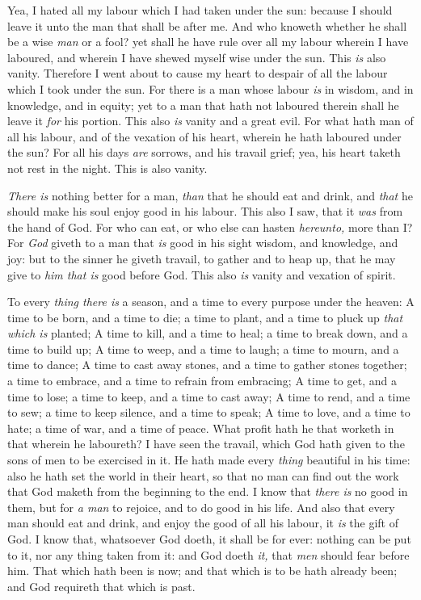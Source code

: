 \documentclass[11pt,letterpaper,oneside]{memoir}
\begin{document}
Yea, I hated all my labour which I had taken under the sun: because I 
should leave it unto the man that shall be after me. And who knoweth 
whether he shall be a wise \emph{man} or a fool? yet shall he have rule 
over all my labour wherein I have laboured, and wherein I have shewed 
myself wise under the sun. This \emph{is} also vanity. Therefore I went 
about to cause my heart to despair of all the labour which I took under 
the sun. For there is a man whose labour \emph{is} in wisdom, and in 
knowledge, and in equity; yet to a man that hath not laboured therein 
shall he leave it \emph{for} his portion. This also \emph{is} vanity and 
a great evil. For what hath man of all his labour, and of the vexation 
of his heart, wherein he hath laboured under the sun? For all his days 
\emph{are} sorrows, and his travail grief; yea, his heart taketh not 
rest in the night. This is also vanity. 

\emph{There is} nothing better for a man, \emph{than} that he should eat 
and drink, and \emph{that} he should make his soul enjoy good in his 
labour. This also I saw, that it \emph{was} from the hand of God. For 
who can eat, or who else can hasten \emph{hereunto,} more than I? For 
\emph{God} giveth to a man that \emph{is} good in his sight wisdom, and 
knowledge, and joy: but to the sinner he giveth travail, to gather and 
to heap up, that he may give to \emph{him that is} good before God. This 
also \emph{is} vanity and vexation of spirit. 

To every \emph{thing there is} a season, and a time to every purpose 
under the heaven: A time to be born, and a time to die; a time to plant, 
and a time to pluck up \emph{that which is} planted; A time to kill, and 
a time to heal; a time to break down, and a time to build up; A time to 
weep, and a time to laugh; a time to mourn, and a time to dance; A time 
to cast away stones, and a time to gather stones together; a time to 
embrace, and a time to refrain from embracing; A time to get, and a time 
to lose; a time to keep, and a time to cast away; A time to rend, and a 
time to sew; a time to keep silence, and a time to speak; A time to 
love, and a time to hate; a time of war, and a time of peace. What 
profit hath he that worketh in that wherein he laboureth? I have seen 
the travail, which God hath given to the sons of men to be exercised in 
it. He hath made every \emph{thing} beautiful in his time: also he hath 
set the world in their heart, so that no man can find out the work that 
God maketh from the beginning to the end. I know that \emph{there is} no 
good in them, but for \emph{a man} to rejoice, and to do good in his 
life. And also that every man should eat and drink, and enjoy the good 
of all his labour, it \emph{is} the gift of God. I know that, whatsoever 
God doeth, it shall be for ever: nothing can be put to it, nor any thing 
taken from it: and God doeth \emph{it,} that \emph{men} should fear 
before him. That which hath been is now; and that which is to be hath 
already been; and God requireth that which is past. 
\end{document}
